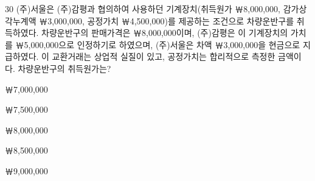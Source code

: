 \begin{question}{30}
(주)서울은 (주)감평과 협의하여 사용하던 기계장치(취득원가 ￦8,000,000, 감가상각누계액 ￦3,000,000, 공정가치 ￦4,500,000)를 제공하는 조건으로 차량운반구를 취득하였다. 차량운반구의 판매가격은 ￦8,000,000이며, (주)감평은 이 기계장치의 가치를 ￦5,000,000으로 인정하기로 하였으며, (주)서울은 차액 ￦3,000,000을 현금으로 지급하였다. 이 교환거래는 상업적 실질이 있고, 공정가치는 합리적으로 측정한 금액이다. 차량운반구의 취득원가는?
\begin{choices}
  \item ￦7,000,000
  \item ￦7,500,000
  \item ￦8,000,000
  \item ￦8,500,000
  \item ￦9,000,000
\end{choices}
\end{question}
